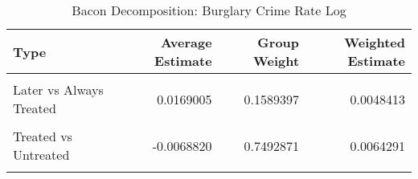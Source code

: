 \begin{table}[H]

\caption{\label{tab:tab:bacondecompositionBurglary}Bacon Decomposition: Burglary Crime Rate Log}
\centering
\begin{tabular}[t]{lrrr}
\toprule
Type & Average Estimate & Group Weight & Weighted Estimate\\
\midrule
\cellcolor{gray!6}{Earlier vs Later Treated} & \cellcolor{gray!6}{-0.0146061} & \cellcolor{gray!6}{0.0683810} & \cellcolor{gray!6}{-0.0023226}\\
Later vs Always Treated & 0.0169005 & 0.1589397 & 0.0048413\\
\cellcolor{gray!6}{Later vs Earlier Treated} & \cellcolor{gray!6}{-0.0157802} & \cellcolor{gray!6}{0.0233921} & \cellcolor{gray!6}{-0.0013013}\\
Treated vs Untreated & -0.0068820 & 0.7492871 & 0.0064291\\
\cellcolor{gray!6}{Total TWFE} & \cellcolor{gray!6}{NaN} & \cellcolor{gray!6}{NaN} & \cellcolor{gray!6}{0.0076465}\\
\bottomrule
\end{tabular}
\end{table}
